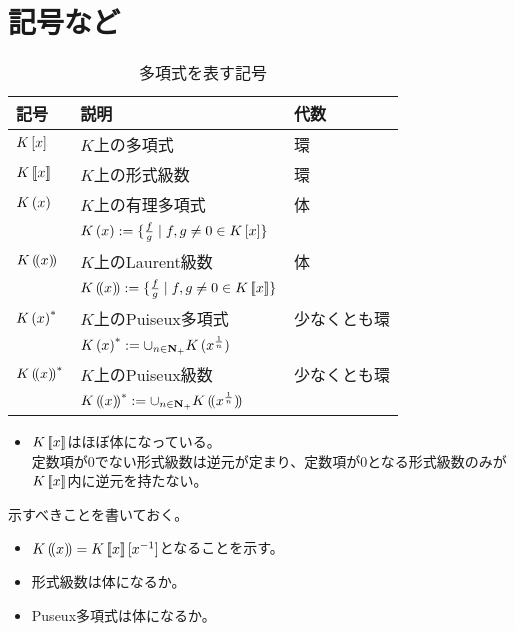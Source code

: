 \begingroup %

{\setlength\arraycolsep{2pt}
%
\section{記号など}\label{s1:記号など} %
	\begin{table}[H] %
		\begin{center}\begin{tabular}{l|ll} \hline
			記号 & 説明 & 代数 \\ \hline
			$K\mathinner{[{x}]}$ & $K$上の多項式 & 環 \\
			$K\mathinner{[\![{x}]\!]}$ & $K$上の形式級数 & 環 \\
			$K\mathinner{({x})}$ & $K$上の有理多項式 & 体 \\
			& $K\mathinner{({x})} := \mathinner{\{{\frac{f}{g}\mid f,g\neq0\in K\mathinner{[{x}]}}\}}$ \\
			$K\mathinner{(\!({x})\!)}$ & $K$上のLaurent級数 & 体 \\
			& $K\mathinner{(\!({x})\!)} := \mathinner{\{{\frac{f}{g}\mid f,g\neq0\in K\mathinner{[\![{x}]\!]}}\}}$ \\
			$K\mathinner{({x})}^*$ & $K$上のPuiseux多項式 & 少なくとも環 \\
			& $K\mathinner{({x})}^*:=\cup_{n\in\mathbf{N}_+}K\mathinner{({x^{\frac{1}{n}}})}$ \\
			$K\mathinner{(\!({x})\!)}^*$ & $K$上のPuiseux級数 & 少なくとも環 \\
			& $K\mathinner{(\!({x})\!)}^*:=\cup_{n\in\mathbf{N}_+}K\mathinner{(\!({x^{\frac{1}{n}}})\!)}$ \\
		\end{tabular}\end{center}
		\caption{多項式を表す記号}
	\end{table} %

	\begin{itemize}\setlength{\itemsep}{-1mm} %
		\item $K\mathinner{[\![{x}]\!]}$はほぼ体になっている。\\
		定数項が$0$でない形式級数は逆元が定まり、定数項が$0$となる形式級数のみが
		$K\mathinner{[\![{x}]\!]}$内に逆元を持たない。
	\end{itemize} %

	\begin{todo}[示すべきこと]\label{todo:示すべきこと} %
		示すべきことを書いておく。
		\begin{itemize}\setlength{\itemsep}{-1mm} %
			\item $K\mathinner{(\!({x})\!)}=K\mathinner{[\![{x}]\!]}[x^{-1}]$となることを示す。
			\item 形式級数は体になるか。
			\item Puseux多項式は体になるか。
		\end{itemize} %
	\end{todo} %
}
